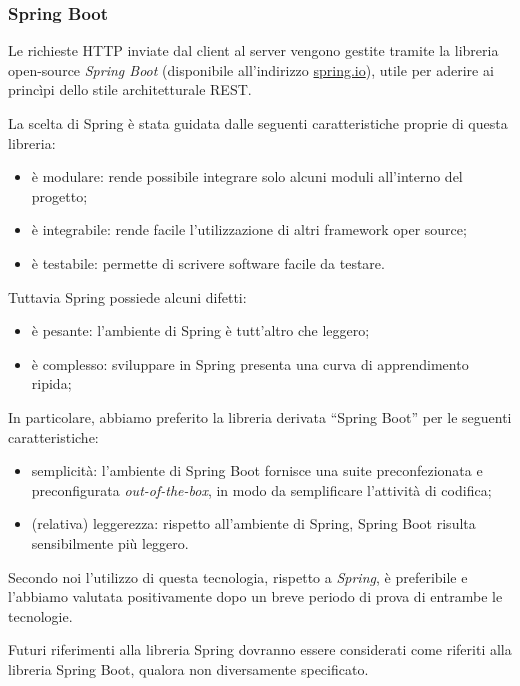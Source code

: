 \subsubsection{Spring Boot}
Le richieste HTTP inviate dal client al server vengono gestite tramite la libreria open-source \emph{Spring Boot} (disponibile all'indirizzo \url{spring.io}), utile per aderire ai princìpi dello stile architetturale REST.

La scelta di Spring è stata guidata dalle seguenti caratteristiche proprie di questa libreria:
\begin{itemize}
	\item \`e modulare: rende possibile integrare solo alcuni moduli all'interno del progetto;
	\item \`e integrabile: rende facile l'utilizzazione di altri framework oper source;
	\item \`e testabile: permette di scrivere software facile da testare.
\end{itemize}
Tuttavia Spring possiede alcuni difetti:
\begin{itemize}
	\item \`e pesante: l'ambiente di Spring è tutt'altro che leggero;
	\item \`e complesso: sviluppare in Spring presenta una curva di apprendimento ripida;
\end{itemize}

In particolare, abbiamo preferito la libreria derivata ``Spring Boot'' per le seguenti caratteristiche:
\begin{itemize}
	\item semplicità: l'ambiente di Spring Boot fornisce una suite preconfezionata e preconfigurata \emph{out-of-the-box}, in modo da semplificare l'attività di codifica;
	\item (relativa) leggerezza: rispetto all'ambiente di Spring, Spring Boot risulta sensibilmente più leggero.
\end{itemize}

Secondo noi l'utilizzo di questa tecnologia, rispetto a \emph{Spring}, è preferibile e l'abbiamo valutata positivamente dopo un breve periodo di prova di entrambe le tecnologie.

Futuri riferimenti alla libreria Spring dovranno essere considerati come riferiti alla libreria Spring Boot, qualora non diversamente specificato.


